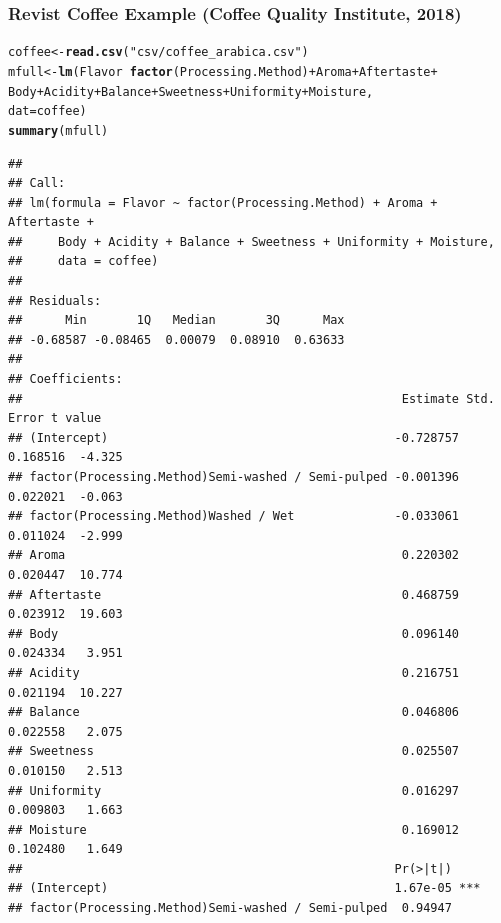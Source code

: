 \documentclass[oneside]{book}\usepackage[]{graphicx}\usepackage[dvipsnames,table,xcdraw]{xcolor}
\makeatletter
\newcommand{\hlstr}[1]{\textcolor[rgb]{0.192,0.494,0.8}{#1}}%
\newcommand{\hlopt}[1]{\textcolor[rgb]{0,0,0}{#1}}%
\newcommand{\hlstd}[1]{\textcolor[rgb]{0.345,0.345,0.345}{#1}}%
\newcommand{\hlkwb}[1]{\textcolor[rgb]{0.69,0.353,0.396}{#1}}%
\newcommand{\hlkwc}[1]{\textcolor[rgb]{0.333,0.667,0.333}{#1}}%
\newcommand{\hlkwd}[1]{\textcolor[rgb]{0.737,0.353,0.396}{\textbf{#1}}}%
\newenvironment{kframe}{%
 \def\at@end@of@kframe{}%
 \ifinner\ifhmode%
  \def\at@end@of@kframe{\end{minipage}}%
  \begin{minipage}{\columnwidth}%
 \fi\fi%
 \def\FrameCommand##1{\hskip\@totalleftmargin \hskip-\fboxsep
 \colorbox{shadecolor}{##1}\hskip-\fboxsep
     \hskip-\linewidth \hskip-\@totalleftmargin \hskip\columnwidth}%
 \MakeFramed {\advance\hsize-\width
   \@totalleftmargin\z@ \linewidth\hsize
   \@setminipage}}%
 {\par\unskip\endMakeFramed%
 \at@end@of@kframe}
\newenvironment{knitrout}{}{} %
\makeatother
\begin{document}
    \subsubsection{Revist Coffee Example (Coffee Quality Institute, 2018)}

\begin{knitrout}
\color{fgcolor}\begin{kframe}
\begin{alltt}
\hlstd{coffee} \hlkwb{<-} \hlkwd{read.csv}\hlstd{(}\hlstr{"csv/coffee_arabica.csv"}\hlstd{)}
\hlstd{mfull} \hlkwb{<-} \hlkwd{lm}\hlstd{(Flavor} \hlopt{~} \hlkwd{factor}\hlstd{(Processing.Method)} \hlopt{+} \hlstd{Aroma} \hlopt{+} \hlstd{Aftertaste} \hlopt{+}
  \hlstd{Body} \hlopt{+} \hlstd{Acidity} \hlopt{+} \hlstd{Balance} \hlopt{+} \hlstd{Sweetness} \hlopt{+} \hlstd{Uniformity} \hlopt{+} \hlstd{Moisture,}
  \hlkwc{dat} \hlstd{= coffee)}
\hlkwd{summary}\hlstd{(mfull)}
\end{alltt}
\begin{verbatim}
## 
## Call:
## lm(formula = Flavor ~ factor(Processing.Method) + Aroma + Aftertaste + 
##     Body + Acidity + Balance + Sweetness + Uniformity + Moisture, 
##     data = coffee)
## 
## Residuals:
##      Min       1Q   Median       3Q      Max 
## -0.68587 -0.08465  0.00079  0.08910  0.63633 
## 
## Coefficients:
##                                                     Estimate Std. Error t value
## (Intercept)                                        -0.728757   0.168516  -4.325
## factor(Processing.Method)Semi-washed / Semi-pulped -0.001396   0.022021  -0.063
## factor(Processing.Method)Washed / Wet              -0.033061   0.011024  -2.999
## Aroma                                               0.220302   0.020447  10.774
## Aftertaste                                          0.468759   0.023912  19.603
## Body                                                0.096140   0.024334   3.951
## Acidity                                             0.216751   0.021194  10.227
## Balance                                             0.046806   0.022558   2.075
## Sweetness                                           0.025507   0.010150   2.513
## Uniformity                                          0.016297   0.009803   1.663
## Moisture                                            0.169012   0.102480   1.649
##                                                    Pr(>|t|)    
## (Intercept)                                        1.67e-05 ***
## factor(Processing.Method)Semi-washed / Semi-pulped  0.94947    

\end{verbatim}
\end{kframe}
\end{knitrout}
\end{document}
